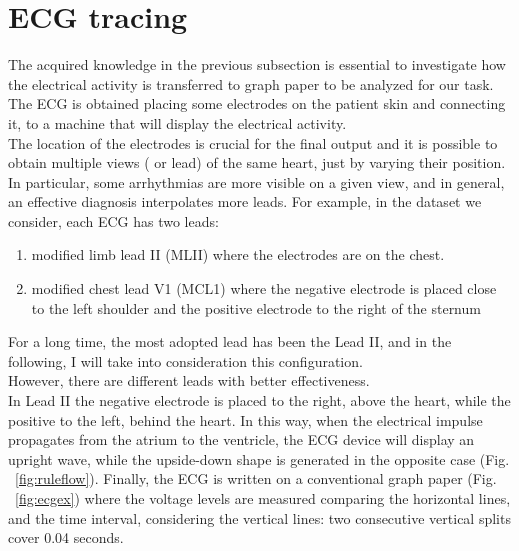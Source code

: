 \documentclass[LaM,binding=0.6cm]{sapthesis}
\begin{document}
\section{ECG tracing}
The acquired knowledge in the previous subsection is essential to investigate how the electrical activity is transferred to graph paper to be analyzed for our task.\\The ECG is obtained placing some electrodes on the patient skin and connecting it, to a machine that will display the electrical activity.\\The location of the electrodes is crucial for the final output and it is possible to obtain multiple views ( or lead) of the same heart, just by varying their position.\\In particular, some arrhythmias are more visible on a given view, and in general, an effective diagnosis interpolates more leads. For example, in the dataset we consider, each ECG has two leads:
\begin{enumerate}
\item modified limb lead II (MLII) where the electrodes are on the chest.
\item modified chest lead V1 (MCL1) where the negative electrode is placed close to the left shoulder and the positive electrode to the right of the sternum 
\end{enumerate}
For a long time, the most adopted lead has been the Lead II, and in the following, I will take into consideration this configuration.\\However, there are different leads with better effectiveness.\\In Lead II the negative electrode is placed to the right, above the heart, while the positive to the left, behind the heart. In this way, when the electrical impulse propagates from the atrium to the ventricle, the ECG device will display an upright wave, while the upside-down shape is generated in the opposite case (Fig. ~\ref{fig:ruleflow}).
Finally, the ECG is written on a conventional graph paper (Fig. ~\ref{fig:ecgex}) where the voltage levels are measured comparing the horizontal lines, and the time interval, considering the vertical lines: two consecutive vertical splits cover 0.04 seconds.
\end{document}
